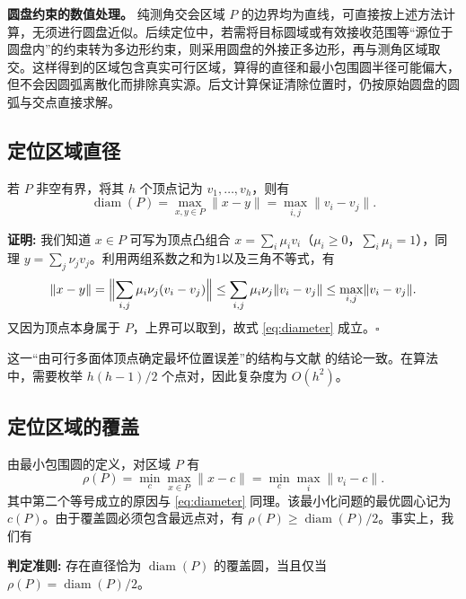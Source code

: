 \documentclass[UTF8,a4paper,zihao=-4,fontset=none]{ctexart}
\begin{document}
\textbf{圆盘约束的数值处理。} 纯测角交会区域 \(P\) 的边界均为直线，可直接按上述方法计算，无须进行圆盘近似。后续定位中，若需将目标圆域或有效接收范围等“源位于圆盘内”的约束转为多边形约束，则采用圆盘的外接正多边形，再与测角区域取交。这样得到的区域包含真实可行区域，算得的直径和最小包围圆半径可能偏大，但不会因圆弧离散化而排除真实源。后文计算保证清除位置时，仍按原始圆盘的圆弧与交点直接求解。

\subsection{定位区域直径}

若 \(P\) 非空有界，将其 \(h\) 个顶点记为 \(v_1,\dots,v_h\)，则有
\begin{equation}
  \operatorname{diam}(P)=\max_{x,y\in P}\lVert x-y\rVert=\max_{i,j}\lVert v_i-v_j\rVert .
  \label{eq:diameter}
\end{equation}

\textbf{证明:} 我们知道 \(x\in P\) 可写为顶点凸组合 \(x=\sum_i\mu_iv_i\)（\(\mu_i\ge0\)，\(\sum_i\mu_i=1\)），同理 \(y=\sum_j\nu_jv_j\)。利用两组系数之和为1以及三角不等式，有
\begin{equation}
  \lVert x-y\rVert
  =\Bigl\lVert\sum_{i,j}\mu_i\nu_j(v_i-v_j)\Bigr\rVert
  \le\sum_{i,j}\mu_i\nu_j\lVert v_i-v_j\rVert
  \le\max_{i,j}\lVert v_i-v_j\rVert .
\end{equation}
又因为顶点本身属于 \(P\)，上界可以取到，故式 \eqref{eq:diameter} 成立。\(\square\) 

这一“由可行多面体顶点确定最坏位置误差”的结构与文献 \cite{Gholami2015} 的结论一致。在算法中，需要枚举 \(h(h-1)/2\) 个点对，因此复杂度为 \(O(h^2)\)。

\subsection{定位区域的覆盖}

由最小包围圆的定义，对区域 \(P\) 有
\begin{equation}
  \rho(P)=\min_c\max_{x\in P}\lVert x-c\rVert
  =\min_c\max_i\lVert v_i-c\rVert .
  \label{eq:mincircle}
\end{equation}
其中第二个等号成立的原因与 \eqref{eq:diameter} 同理。该最小化问题的最优圆心记为 \(c(P)\)。由于覆盖圆必须包含最远点对，有 \(\rho(P)\ge\operatorname{diam}(P)/2\)。事实上，我们有

\textbf{判定准则: } 存在直径恰为 \(\operatorname{diam}(P)\) 的覆盖圆，当且仅当 \(\rho(P)=\operatorname{diam}(P)/2\)。
\end{document}
